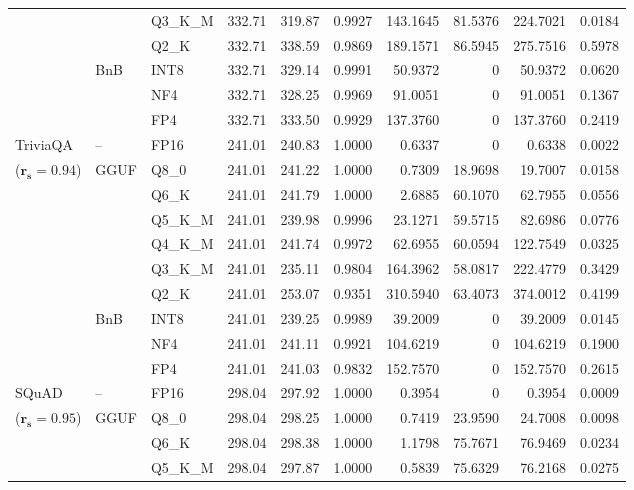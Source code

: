 \begin{longtable}{ll l rrrrrrr}
 &  & Q3\_K\_M & 332.71 & 319.87 & 0.9927 & 143.1645 & 81.5376 & 224.7021 & 0.0184 \\
 &  & Q2\_K & 332.71 & 338.59 & 0.9869 & 189.1571 & 86.5945 & 275.7516 & 0.5978 \\
 & BnB & INT8 & 332.71 & 329.14 & 0.9991 & 50.9372 & \cellcolor{cyan!12} $0$ & 50.9372 & 0.0620 \\
 &  & NF4 & 332.71 & 328.25 & 0.9969 & 91.0051 & \cellcolor{cyan!12} $0$ & 91.0051 & 0.1367 \\
 &  & FP4 & 332.71 & 333.50 & 0.9929 & 137.3760 & \cellcolor{cyan!12} $0$ & 137.3760 & 0.2419 \\
\midrule
TriviaQA & -- & FP16 & 241.01 & 240.83 & 1.0000 & 0.6337 & \cellcolor{cyan!12} $0$ & 0.6338 & 0.0022 \\
{\small ($\mathbf{r_s{=}0.94}$)} & GGUF & Q8\_0 & 241.01 & 241.22 & 1.0000 & 0.7309 & 18.9698 & 19.7007 & 0.0158 \\
 &  & Q6\_K & 241.01 & 241.79 & 1.0000 & 2.6885 & 60.1070 & 62.7955 & 0.0556 \\
 &  & Q5\_K\_M & 241.01 & 239.98 & 0.9996 & 23.1271 & 59.5715 & 82.6986 & 0.0776 \\
 &  & Q4\_K\_M & 241.01 & 241.74 & 0.9972 & 62.6955 & 60.0594 & 122.7549 & 0.0325 \\
 &  & Q3\_K\_M & 241.01 & 235.11 & 0.9804 & 164.3962 & 58.0817 & 222.4779 & 0.3429 \\
 &  & Q2\_K & 241.01 & 253.07 & \cellcolor{red!18} 0.9351 & \cellcolor{red!18} 310.5940 & 63.4073 & \cellcolor{red!18} 374.0012 & \cellcolor{red!18} 0.4199 \\
 & BnB & INT8 & 241.01 & 239.25 & 0.9989 & 39.2009 & \cellcolor{cyan!12} $0$ & 39.2009 & 0.0145 \\
 &  & NF4 & 241.01 & 241.11 & 0.9921 & 104.6219 & \cellcolor{cyan!12} $0$ & 104.6219 & 0.1900 \\
 &  & FP4 & 241.01 & 241.03 & 0.9832 & 152.7570 & \cellcolor{cyan!12} $0$ & 152.7570 & 0.2615 \\
\midrule
SQuAD & -- & FP16 & 298.04 & 297.92 & 1.0000 & 0.3954 & \cellcolor{cyan!12} $0$ & 0.3954 & 0.0009 \\
{\small ($\mathbf{r_s{=}0.95}$)} & GGUF & Q8\_0 & 298.04 & 298.25 & 1.0000 & 0.7419 & 23.9590 & 24.7008 & 0.0098 \\
 &  & Q6\_K & 298.04 & 298.38 & 1.0000 & 1.1798 & 75.7671 & 76.9469 & 0.0234 \\
 &  & Q5\_K\_M & 298.04 & 297.87 & 1.0000 & 0.5839 & 75.6329 & 76.2168 & 0.0275 \\

\end{longtable}
